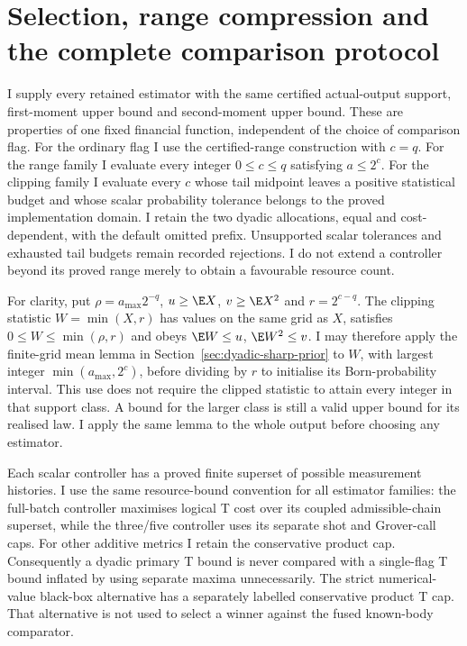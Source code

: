 \section{Selection, range compression and the complete comparison protocol}
\label{sec:value-comparison-protocol}

I supply every retained estimator with the same certified actual-output support,
first-moment upper bound and second-moment upper bound. These are properties of
one fixed financial function, independent of the choice of comparison flag.
For the ordinary flag I use the certified-range construction with $c=q$.
For the range family I evaluate every integer $0\leq c\leq q$ satisfying
$a\leq2^c$. For the clipping family I evaluate every $c$ whose tail midpoint
leaves a positive statistical budget and whose scalar probability tolerance
belongs to the proved implementation domain. I retain the two dyadic
allocations, equal and cost-dependent, with the default omitted prefix.
Unsupported scalar tolerances and exhausted tail budgets remain recorded
rejections. I do not extend a controller beyond its proved range merely to
obtain a favourable resource count.

For clarity, put $\rho=a_{\max}2^{-q}$, $u\geq\E X$, $v\geq\E X^2$
and $r=2^{c-q}$. The clipping statistic $W=\min(X,r)$ has values on the
same grid as $X$, satisfies $0\leq W\leq\min(\rho,r)$ and obeys
$\E W\leq u$, $\E W^2\leq v$. I may therefore apply the finite-grid
mean lemma in Section~\ref{sec:dyadic-sharp-prior} to $W$, with largest
integer $\min(a_{\max},2^c)$, before dividing by $r$ to initialise its
Born-probability interval. This use does not require the clipped statistic to
attain every integer in that support class. A bound for the larger class is
still a valid upper bound for its realised law. I apply the same lemma to the
whole output before choosing any estimator.

Each scalar controller has a proved finite superset of possible measurement
histories. I use the same resource-bound convention for all estimator
families: the full-batch controller maximises logical T cost over its coupled
admissible-chain superset, while the three/five controller uses its separate
shot and Grover-call caps. For other additive metrics I retain the conservative
product cap. Consequently a dyadic primary T bound is never compared with a
single-flag T bound inflated by using separate maxima unnecessarily. The
strict numerical-value black-box alternative has a separately labelled
conservative product T cap. That alternative is not used to select a winner
against the fused known-body comparator.

